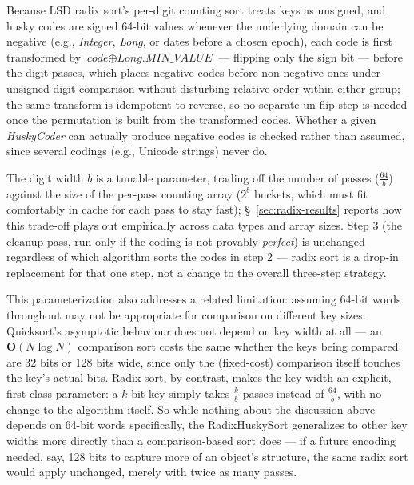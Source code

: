 \documentclass[twoside,leqno,twocolumn]{article}
\begin{document}
Because LSD radix sort's per-digit counting sort treats keys as unsigned,
and husky codes are signed 64-bit values whenever the underlying domain can be negative (e.g., \textit{Integer},
\textit{Long}, or dates before a chosen epoch), each code is first transformed by $\textit{code} \oplus \textit{Long.MIN\_VALUE}$ —
flipping only the sign bit — before the digit passes,
which places negative codes before non-negative ones under unsigned digit comparison without disturbing relative order within either group;
the same transform is idempotent to reverse, so no separate un-flip step is needed once the permutation is built from the transformed codes.
Whether a given \textit{HuskyCoder} can actually produce negative codes is checked rather than assumed,
since several codings (e.g., Unicode strings) never do.

The digit width $b$ is a tunable parameter, trading off the number of passes ($\frac{64}{b}$)
against the size of the per-pass counting array ($2^b$ buckets, which must fit comfortably in cache for each pass to stay fast);
\S~\ref{sec:radix-results} reports how this trade-off plays out empirically across data types and array sizes.
Step 3 (the cleanup pass, run only if the coding is not provably \textit{perfect})
is unchanged regardless of which algorithm sorts the codes in step 2 —
radix sort is a drop-in replacement for that one step, not a change to the overall three-step strategy.

This parameterization also addresses a related limitation:
assuming 64-bit words throughout may not be appropriate for comparison on different key sizes.
Quicksort's asymptotic behaviour does not depend on key width at all —
an $\textbf{O}(N \log N)$ comparison sort costs the same whether the keys being compared are 32 bits or 128 bits wide,
since only the (fixed-cost) comparison itself touches the key's actual bits.
Radix sort, by contrast, makes the key width an explicit, first-class parameter:
a $k$-bit key simply takes $\frac{k}{b}$ passes instead of $\frac{64}{b}$, with no change to the algorithm itself.
So while nothing about the discussion above depends on 64-bit words specifically,
the RadixHuskySort generalizes to other key widths more directly than a comparison-based sort does —
if a future encoding needed, say, 128 bits to capture more of an object's structure,
the same radix sort would apply unchanged, merely with twice as many passes.
\end{document}
